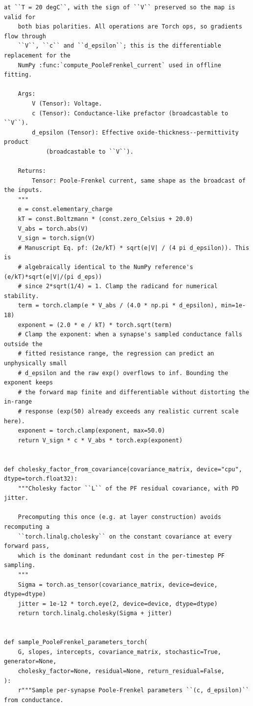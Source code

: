 \begin{lstlisting}[caption={mnn\_torch/effects.py},label={lst:mnn-src-effects}]
    at ``T = 20 degC``, with the sign of ``V`` preserved so the map is valid for
    both bias polarities. All operations are Torch ops, so gradients flow through
    ``V``, ``c`` and ``d_epsilon``; this is the differentiable replacement for the
    NumPy :func:`compute_PooleFrenkel_current` used in offline fitting.

    Args:
        V (Tensor): Voltage.
        c (Tensor): Conductance-like prefactor (broadcastable to ``V``).
        d_epsilon (Tensor): Effective oxide-thickness--permittivity product
            (broadcastable to ``V``).

    Returns:
        Tensor: Poole-Frenkel current, same shape as the broadcast of the inputs.
    """
    e = const.elementary_charge
    kT = const.Boltzmann * (const.zero_Celsius + 20.0)
    V_abs = torch.abs(V)
    V_sign = torch.sign(V)
    # Manuscript Eq. pf: (2e/kT) * sqrt(e|V| / (4 pi d_epsilon)). This is
    # algebraically identical to the NumPy reference's (e/kT)*sqrt(e|V|/(pi d_eps))
    # since 2*sqrt(1/4) = 1. Clamp the radicand for numerical stability.
    term = torch.clamp(e * V_abs / (4.0 * np.pi * d_epsilon), min=1e-18)
    exponent = (2.0 * e / kT) * torch.sqrt(term)
    # Clamp the exponent: when a synapse's sampled conductance falls outside the
    # fitted resistance range, the regression can predict an unphysically small
    # d_epsilon and the raw exp() overflows to inf. Bounding the exponent keeps
    # the forward map finite and differentiable without distorting the in-range
    # response (exp(50) already exceeds any realistic current scale here).
    exponent = torch.clamp(exponent, max=50.0)
    return V_sign * c * V_abs * torch.exp(exponent)


def cholesky_factor_from_covariance(covariance_matrix, device="cpu", dtype=torch.float32):
    """Cholesky factor ``L`` of the PF residual covariance, with PD jitter.

    Precomputing this once (e.g. at layer construction) avoids recomputing a
    ``torch.linalg.cholesky`` on the constant covariance at every forward pass,
    which is the dominant redundant cost in the per-timestep PF sampling.
    """
    Sigma = torch.as_tensor(covariance_matrix, device=device, dtype=dtype)
    jitter = 1e-12 * torch.eye(2, device=device, dtype=dtype)
    return torch.linalg.cholesky(Sigma + jitter)


def sample_PooleFrenkel_parameters_torch(
    G, slopes, intercepts, covariance_matrix, stochastic=True, generator=None,
    cholesky_factor=None, residual=None, return_residual=False,
):
    r"""Sample per-synapse Poole-Frenkel parameters ``(c, d_epsilon)`` from conductance.


\end{lstlisting}
